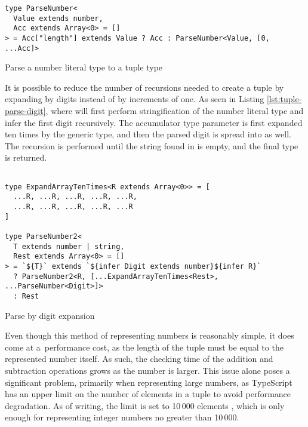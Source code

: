 \begin{listing}[ht]
  \begin{verbatim}
type ParseNumber<
  Value extends number,
  Acc extends Array<0> = []
> = Acc["length"] extends Value ? Acc : ParseNumber<Value, [0, ...Acc]>
\end{verbatim}
  \caption{Parse a number literal type to a tuple type}\label{lst:tuple-parse}
\end{listing}

It is possible to reduce the number of recursions needed to create a tuple by expanding by digits instead of by increments of one. As seen in Listing \ref{lst:tuple-parse-digit}, where  will first perform stringification of the number literal type  and infer the first digit recursively. The accumulator type parameter  is first expanded ten times by the  generic type, and then the parsed digit is spread into  as well. The recursion is performed until the string found in  is empty, and the final  type is returned.

\begin{listing}[ht]
  \begin{verbatim}

type ExpandArrayTenTimes<R extends Array<0>> = [
  ...R, ...R, ...R, ...R, ...R,
  ...R, ...R, ...R, ...R, ...R
]
    
type ParseNumber2<
  T extends number | string,
  Rest extends Array<0> = []
> = `${T}` extends `${infer Digit extends number}${infer R}`
  ? ParseNumber2<R, [...ExpandArrayTenTimes<Rest>, ...ParseNumber<Digit>]>
  : Rest
\end{verbatim}
  \caption{Parse by digit expansion}\label{lst:tuple-parse-digit}
\end{listing}

Even though this method of representing numbers is reasonably simple, it does come at a~performance cost, as the length of the tuple must be equal to the represented number itself. As such, the checking time of the addition and subtraction operations grows as the number is larger. This issue alone poses a significant problem, primarily when representing large numbers, as TypeScript has an upper limit on the number of elements in a tuple to avoid performance degradation. As of writing, the limit is set to 10\,000 elements \cite{ImplementationCheckerTs2023}, which is only enough for representing integer numbers no greater than 10\,000.

